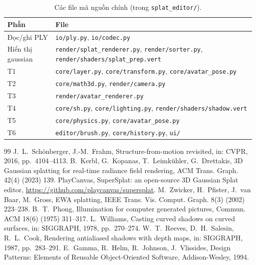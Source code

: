 \documentclass[9pt,twocolumn,a4paper]{extarticle}
\newcommand{\code}[1]{\texttt{#1}}
\begin{document}
\begin{table}[H]
\centering
\caption{Các file mã nguồn chính (trong \code{splat\_editor/}).}
\label{tab:src}
\footnotesize
\begin{tabular}{@{}p{2.2cm}>{\raggedright\arraybackslash}p{5.5cm}@{}}
\toprule
Phần & File \\
\midrule
Đọc/ghi PLY & \mbox{\code{io/ply.py}}, \mbox{\code{io/codec.py}} \\
Hiển thị gaussian & \mbox{\code{render/splat\_renderer.py}}, \mbox{\code{render/sorter.py}}, \mbox{\code{render/shaders/splat\_prep.vert}} \\
T1 & \mbox{\code{core/layer.py}}, \mbox{\code{core/transform.py}}, \mbox{\code{core/avatar\_pose.py}} \\
T2 & \mbox{\code{core/math3d.py}}, \mbox{\code{render/camera.py}} \\
T3 & \mbox{\code{render/avatar\_renderer.py}} \\
T4 & \mbox{\code{core/sh.py}}, \mbox{\code{core/lighting.py}}, \mbox{\code{render/shaders/shadow.vert}} \\
T5 & \mbox{\code{core/physics.py}}, \mbox{\code{core/avatar\_pose.py}} \\
T6 & \mbox{\code{editor/brush.py}}, \mbox{\code{core/history.py}}, \mbox{\code{ui/}} \\
\bottomrule
\end{tabular}
\end{table}

\begin{thebibliography}{99}\footnotesize\itemsep0pt\parskip0pt
 J.~L.~Sch{\"o}nberger, J.-M.~Frahm, Structure-from-motion revisited, in: CVPR, 2016, pp.~4104--4113.
 B.~Kerbl, G.~Kopanas, T.~Leimk{\"u}hler, G.~Drettakis, 3D Gaussian splatting for real-time radiance field rendering, ACM Trans. Graph. 42(4) (2023) 139.
 PlayCanvas, SuperSplat: an open-source 3D Gaussian Splat editor, \url{https://github.com/playcanvas/supersplat}.
 M.~Zwicker, H.~Pfister, J.~van Baar, M.~Gross, EWA splatting, IEEE Trans. Vis. Comput. Graph. 8(3) (2002) 223--238.
 B.~T.~Phong, Illumination for computer generated pictures, Commun. ACM 18(6) (1975) 311--317.
 L.~Williams, Casting curved shadows on curved surfaces, in: SIGGRAPH, 1978, pp.~270--274.
 W.~T.~Reeves, D.~H.~Salesin, R.~L.~Cook, Rendering antialiased shadows with depth maps, in: SIGGRAPH, 1987, pp.~283--291.
 E.~Gamma, R.~Helm, R.~Johnson, J.~Vlissides, Design Patterns: Elements of Reusable Object-Oriented Software, Addison-Wesley, 1994.
\end{thebibliography}
\end{document}

